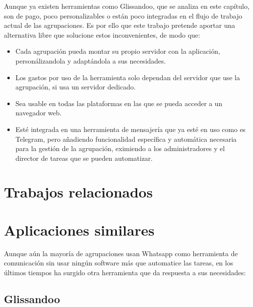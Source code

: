 Aunque ya existen herramientas como Glissandoo, que se analiza en este capítulo, son de pago, poco personalizables o están poco integradas en el flujo de trabajo actual de las agrupaciones. Es por ello que este trabajo pretende aportar una alternativa libre que solucione estos inconvenientes, de modo que:

\begin{itemize}
    \item Cada agrupación pueda montar su propio servidor con la aplicación, personálizandola y adaptándola a sus necesidades.
    \item Los gastos por uso de la herramienta solo dependan del servidor que use la agrupación, si usa un servidor dedicado.
    \item Sea usable en todas las plataformas en las que se pueda acceder a un navegador web.
    \item Esté integrada en una herramienta de mensajería que ya esté en uso como es Telegram, pero añadiendo funcionalidad específica y automática necesaria para la gestión de la agrupación, eximiendo a los administradores y el director de tareas que se pueden automatizar.
\end{itemize}



\section{Trabajos relacionados}

\section{Aplicaciones similares}

Aunque aún la mayoría de agrupaciones usan Whatsapp como herramienta de comunicación sin usar ningún software más que automatice las tareas, en los últimos tiempos ha surgido otra herramienta que da respuesta a sus necesidades:

\subsection{Glissandoo}

